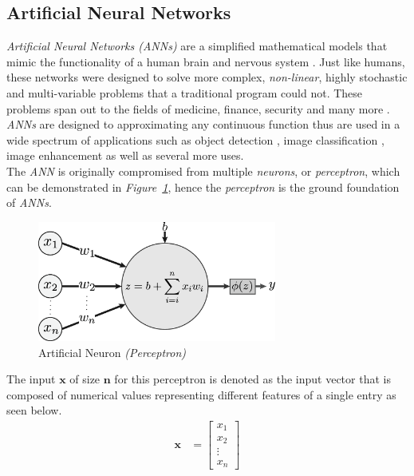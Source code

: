 \documentclass[12pt]{extarticle}
\begin{document}
	\subsection{Artificial Neural Networks}\label{ANN}
	\emph{Artificial Neural Networks (ANNs)} are a simplified mathematical models that mimic the functionality of a human brain and nervous system \cite{ANN, ANN2}. Just like humans, these networks were designed to solve more complex, \emph{non-linear}, highly stochastic and multi-variable problems that a traditional program could not. These problems span out to the fields of medicine, finance, security and many more \cite{ANN_funct}. \emph{ANNs} are designed to approximating any continuous function thus are used in a wide spectrum of applications such as object detection \cite{Objdet, Objdet2}, image classification \cite{classification}, image enhancement \cite{enhancement} as well as several more uses.\\[5mm]
	The \emph{ANN} is originally compromised from multiple \emph{neurons}, or \emph{perceptron}, which can be demonstrated in \emph{Figure~\ref{fig:Perceptron}}, hence the \emph{perceptron} is the ground foundation of \emph{ANNs}.
	\begin{figure}[h]
		\centering
		\includegraphics[width=0.7\textwidth]{pics/Figures/Perceptron.eps}
		\caption{\small{Artificial Neuron \emph{(Perceptron)}}}
		\label{fig:Perceptron}
	\end{figure}
	
	The input $\bm{x}$ of size $\bm{n}$ for this perceptron is denoted as the input vector that is composed of numerical values representing different features of a single entry as seen below.
	\begin{align}
	\bm{x} &= \begin{bmatrix}\label{inputs}
		x_1 \\
		x_2 \\
		\vdots \\
		x_n
	\end{bmatrix}
	\end{align}
\end{document}
